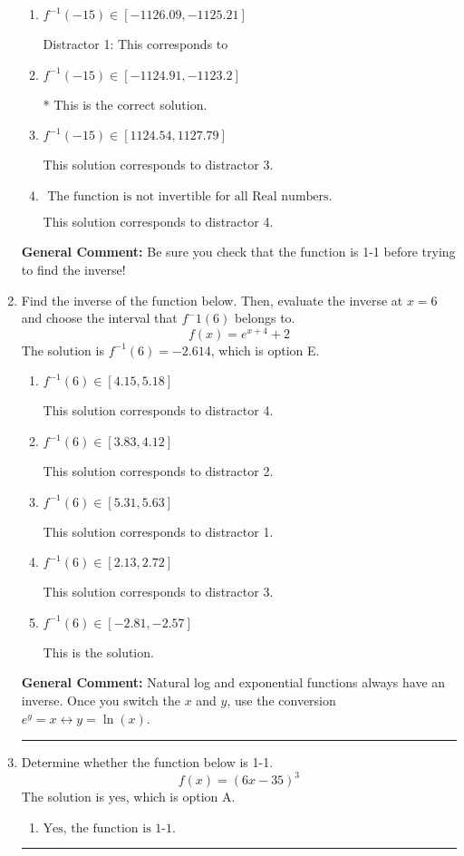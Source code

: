 \documentclass{extbook}[14pt]
\newcommand{\litem}[1]{\item #1

\rule{\textwidth}{0.4pt}}
\begin{document}
\begin{enumerate}
{\begin{enumerate}[label=\Alph*.]
 This solution corresponds to distractor 2.
\item \( f^{-1}(-15) \in [-1126.09, -1125.21] \)

 Distractor 1: This corresponds to 
\item \( f^{-1}(-15) \in [-1124.91, -1123.2] \)

* This is the correct solution.
\item \( f^{-1}(-15) \in [1124.54, 1127.79] \)

 This solution corresponds to distractor 3.
\item \( \text{ The function is not invertible for all Real numbers. } \)

 This solution corresponds to distractor 4.
\end{enumerate}

\textbf{General Comment:} Be sure you check that the function is 1-1 before trying to find the inverse!
}
\litem{
Find the inverse of the function below. Then, evaluate the inverse at $x = 6$ and choose the interval that $f^-1(6)$ belongs to.
\[ f(x) = e^{x+4}+2 \]The solution is \( f^{-1}(6) = -2.614 \), which is option E.\begin{enumerate}[label=\Alph*.]
\item \( f^{-1}(6) \in [4.15, 5.18] \)

 This solution corresponds to distractor 4.
\item \( f^{-1}(6) \in [3.83, 4.12] \)

 This solution corresponds to distractor 2.
\item \( f^{-1}(6) \in [5.31, 5.63] \)

 This solution corresponds to distractor 1.
\item \( f^{-1}(6) \in [2.13, 2.72] \)

 This solution corresponds to distractor 3.
\item \( f^{-1}(6) \in [-2.81, -2.57] \)

 This is the solution.
\end{enumerate}

\textbf{General Comment:} Natural log and exponential functions always have an inverse. Once you switch the $x$ and $y$, use the conversion $ e^y = x \leftrightarrow y=\ln(x)$.
}
\litem{
Determine whether the function below is 1-1.
\[ f(x) = (6 x - 35)^3 \]The solution is \( \text{yes} \), which is option A.\begin{enumerate}[label=\Alph*.]
\item \( \text{Yes, the function is 1-1.} \)


\end{enumerate}}
\end{enumerate}
\end{document}
